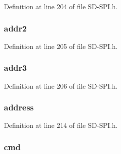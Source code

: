 Definition at line 204 of file S\+D-\/\+S\+P\+I.\+h.

\hypertarget{union_c_m_d___p_a_c_k_e_t_a62faa370ecb5cae05a7eb4a48b75ba21}{}
\subsubsection[{addr2}]{ addr2}\label{union_c_m_d___p_a_c_k_e_t_a62faa370ecb5cae05a7eb4a48b75ba21}


Definition at line 205 of file S\+D-\/\+S\+P\+I.\+h.

\hypertarget{union_c_m_d___p_a_c_k_e_t_ab920792d1ca0b26a9c0bfa1203fe5690}{}
\subsubsection[{addr3}]{ addr3}\label{union_c_m_d___p_a_c_k_e_t_ab920792d1ca0b26a9c0bfa1203fe5690}


Definition at line 206 of file S\+D-\/\+S\+P\+I.\+h.

\hypertarget{union_c_m_d___p_a_c_k_e_t_ac5c3f71d50a709e54201184510194a68}{}
\subsubsection[{address}]{ address}\label{union_c_m_d___p_a_c_k_e_t_ac5c3f71d50a709e54201184510194a68}


Definition at line 214 of file S\+D-\/\+S\+P\+I.\+h.

\hypertarget{union_c_m_d___p_a_c_k_e_t_a5551481d31c4f05ff7864ab00ca62a93}{}
\subsubsection[{cmd}]{ cmd}\label{union_c_m_d___p_a_c_k_e_t_a5551481d31c4f05ff7864ab00ca62a93}


